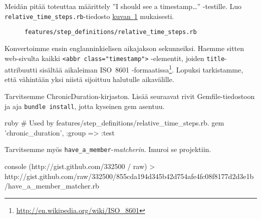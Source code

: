 \documentclass{article}
\newenvironment{myfigure}[1][tbp]{
  \begin{figure}[#1]
    \centering
    \begin{lrbox}{\myfigurebox}
      \begin{minipage}{\textwidth}
}{
      \end{minipage}
    \end{lrbox}
    \colorbox{blue!4}{\usebox{\myfigurebox}}
  \end{figure}
}
\newcommand{\myref}[2]{\hyperref[#2]{#1~\ref*{#2}}}
\newcommand{\pdfforeignlanguage}[2]{\texorpdfstring{\foreignlanguage{#1}{#2}}{#2}}
\newcommand{\eng}[1]{\pdfforeignlanguage{english}{#1}}
\begin{document}
\begin{samepage}
Meidän pitää toteuttaa määrittely ''\eng{I should see a timestamp\dots}''
-testille. Luo \texttt{relative\_time\_steps.rb}-tiedosto
\myref{kuvan}{fig:relative-time-steps} mukaisesti.

\begin{myfigure}[H]
\caption{\texttt{features/step\_definitions/relative\_time\_steps.rb}}
\label{fig:relative-time-steps}

\end{myfigure}
\end{samepage}

Konvertoimme ensin englanninkielisen aikajakson sekunneiksi. Haemme sitten
web-sivulta kaikki \verb!<abbr class="timestamp">! -elementit, joiden
\texttt{title}-attribuutti sisältää aikaleiman ISO~8601
-formaatissa\footnote{\url{http://en.wikipedia.org/wiki/ISO\_8601}}. Lopuksi
tarkistamme, että vähintään yksi niistä sijoittuu halutulle aikavälille.

\begin{samepage}
Tarvitsemme ChronicDuration-kirjaston. Lisää seuraavat rivit
Gemfile-tiedostoon ja aja \texttt{bundle install}, jotta kyseinen gem asentuu.

\begin{pygmented}{ruby}
# Used by features/step_definitions/relative_time_steps.rb.
gem 'chronic_duration', :group => :test
\end{pygmented}
\end{samepage}

\begin{samepage}
Tarvitsemme myös \texttt{have\_a\_member}-\emph{matcherin}. Imuroi se projektiin.

\begin{pygmented}{console}
(http://gist.github.com/332500 / raw)
> http://gist.github.com/raw/332500/855cda194d345b42d754afe4fc08f8177d2d3e1b/have_a_member_matcher.rb
\end{pygmented}
\end{samepage}
\end{document}
